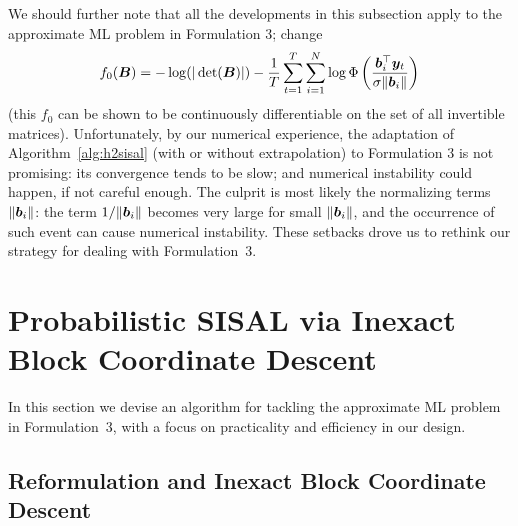 \documentclass[10pt,twocolumn,twoside]{IEEEtran}
\begin{document}
We should further note that all the developments in this subsection apply to the approximate ML problem in Formulation 3; change
\[
f_0({\bm B}) = - \log ( | \det({\bm B}) | ) -  \frac{1}{T} \sum_{t=1}^T \sum_{i=1}^N \log \Phi \left( \frac{ {\bm b}_i^\top {\bm y}_t}{ \sigma \| {\bm b}_i \| } \right)
\]
(this $f_0$ can be shown to be continuously differentiable on the set of all invertible matrices).
Unfortunately, by our numerical experience, the adaptation of Algorithm~\ref{alg:h2sisal} (with or without extrapolation) to Formulation 3 is not promising:
its convergence tends to be slow; and numerical instability could happen, if not careful enough.
The culprit is most likely the normalizing terms $\| {\bm b}_i \|$:
the term $1/\| {\bm b}_i \|$ becomes very large for small $\| {\bm b}_i \|$,
and the occurrence of such event can cause numerical instability.
These setbacks drove us to rethink our strategy for dealing with Formulation~3.


\section{Probabilistic SISAL via Inexact Block Coordinate Descent}

In this section we devise an algorithm for tackling the approximate ML problem in Formulation~3, with a focus on practicality and efficiency in our design.

\subsection{Reformulation and Inexact Block Coordinate Descent}
\end{document}
